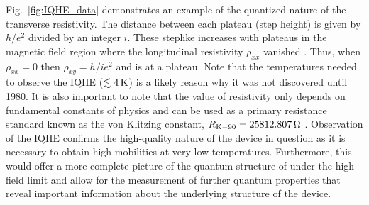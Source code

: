 Fig.~\ref{fig:IQHE_data} demonstrates an example of the quantized nature of the transverse resistivity. The distance between each plateau (step height) is given by $h/e^2$ divided by an integer $i$. These steplike increases with plateaus in the magnetic field region where the longitudinal resistivity $\rho_{xx}$ vanished \cite{Klitzing_RevModPhys1986}. Thus, when $\rho_{xx} = 0$ then $\rho_{xy} = h/i e^2$ and is at a plateau. Note that the temperatures needed to observe the \acs{IQHE} ($\lesssim 4\,\mathrm{K}$) is a likely reason why it was not discovered until 1980. It is also important to note that the value of resistivity only depends on fundamental constants of physics and can be used as a primary resistance standard known as the von Klitzing constant, $R_{\mathrm{K}-90} = 25812.807\,\mathrm{\Omega}$ \cite{Klitzing_PhysRevLett1980,Aoki_PhysRevLett1986,Bliek_Met1988}. Observation of the \acs{IQHE} confirms the high-quality nature of the device in question as it is necessary to obtain high mobilities at very low temperatures. Furthermore, this would offer a more complete picture of the quantum structure of under the high-field limit and allow for the measurement of further quantum properties that reveal important information about the underlying structure of the device.%

